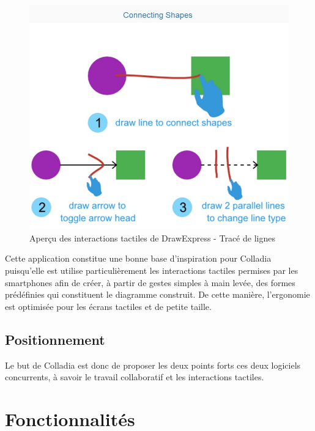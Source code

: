 \documentclass[a4paper,11pt]{article}
\begin{document}
\begin{figure}[!h]
	\centering
	\includegraphics[width=.6\textwidth]{img/DrawExpressLinks}
	\caption{Aperçu des interactions tactiles de DrawExpress - Tracé de lignes}
\end{figure}

Cette application constitue une bonne base d'inspiration pour Colladia puisqu'elle est utilise particulièrement les interactions tactiles permises par les smartphones afin de créer, à partir de gestes simples à main levée, des formes prédéfinies qui constituent le diagramme construit. De cette manière, l'ergonomie est optimisée pour les écrans tactiles et de petite taille.





\subsection{Positionnement}
Le but de Colladia est donc de proposer les deux points forts ces deux logiciels concurrents, à savoir le travail collaboratif et les interactions tactiles.




\section{Fonctionnalités}
\end{document}
